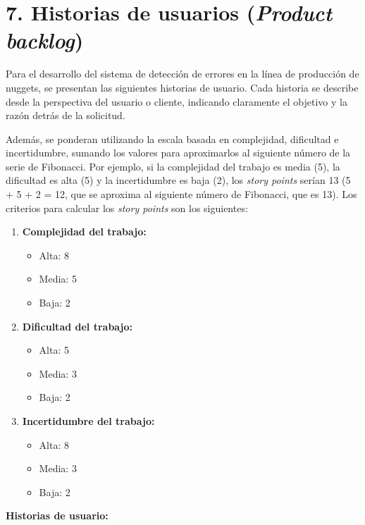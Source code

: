 \documentclass[
11pt, %
]{charter}
\begin{document}
\section{7. Historias de usuarios (\textit{Product backlog})}
\label{sec:backlog}

Para el desarrollo del sistema de detección de errores en la línea de producción de nuggets, se presentan las siguientes historias de usuario. Cada historia se describe desde la perspectiva del usuario o cliente, indicando claramente el objetivo y la razón detrás de la solicitud.

Además, se ponderan utilizando la escala basada en complejidad, dificultad e incertidumbre, sumando los valores para aproximarlos al siguiente número de la serie de Fibonacci. Por ejemplo, si la complejidad del trabajo es media (5), la dificultad es alta (5) y la incertidumbre es baja (2), los \textit{story points} serían 13 (5 + 5 + 2 = 12, que se aproxima al siguiente número de Fibonacci, que es 13). Los criterios para calcular los \textit{story points} son los siguientes:

\begin{enumerate}
	\item \textbf{Complejidad del trabajo:}
	\begin{itemize}
		\item Alta: 8
		\item Media: 5
		\item Baja: 2
	\end{itemize}
	\item \textbf{Dificultad del trabajo:}
	\begin{itemize}
		\item Alta: 5
		\item Media: 3
		\item Baja: 2
	\end{itemize}
	\item \textbf{Incertidumbre del trabajo:}
	\begin{itemize}
		\item Alta: 8
		\item Media: 3
		\item Baja: 2
	\end{itemize}
\end{enumerate}

\textbf{Historias de usuario:}
\end{document}
